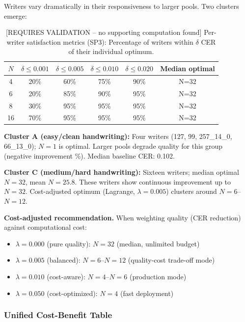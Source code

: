 \documentclass[10.5pt,a4paper]{article}
\newcommand{\src}[1]{\par\vspace{1pt}{\footnotesize\textcolor{gray}{Source:} #1\par}}
\begin{document}
Writers vary dramatically in their responsiveness to larger pools. Two clusters emerge:

\begin{table}[H]
\centering
\caption{[REQUIRES VALIDATION -- no supporting computation found] Per-writer satisfaction metrics (SP3): Percentage of writers within $\delta$ CER of their individual optimum.}
\label{tab:f8_satisfaction}
\small
\begin{tabular}{cccccc}
\toprule
$N$ & $\delta \le 0.001$ & $\delta \le 0.005$ & $\delta \le 0.010$ & $\delta \le 0.020$ & Median optimal \\
\midrule
4 & 20\% & 60\% & 75\% & 90\% & N=32 \\
6 & 20\% & 85\% & 90\% & 95\% & N=32 \\
8 & 30\% & 95\% & 95\% & 95\% & N=32 \\
16 & 70\% & 95\% & 95\% & 95\% & N=32 \\
\bottomrule
\end{tabular}
\src{SP3 per-writer analysis}
\end{table}

\textbf{Cluster A (easy/clean handwriting):} Four writers (127, 99, 257\_14\_0, 66\_13\_0); $N{=}1$ is optimal. Larger pools
degrade quality for this group (negative improvement \%). Median baseline CER: 0.102.

\textbf{Cluster C (medium/hard handwriting):} Sixteen writers; median optimal $N{=}32$, mean $N{=}25.8$. These writers show
continuous improvement up to $N{=}32$. Cost-adjusted optimum (Lagrange, $\lambda{=}0.005$) clusters around $N{=}6$--$N{=}12$.

\textbf{Cost-adjusted recommendation.} When weighting quality (CER reduction) against computational cost:
\begin{itemize}
	\item $\lambda{=}0.000$ (pure quality): $N{=}32$ (median, unlimited budget)
	\item $\lambda{=}0.005$ (balanced): $N{=}6$--$N{=}12$ (quality-cost trade-off mode)
	\item $\lambda{=}0.010$ (cost-aware): $N{=}4$--$N{=}6$ (production mode)
	\item $\lambda{=}0.050$ (cost-optimized): $N{=}4$ (fast deployment)
\end{itemize}

\subsubsection{Unified Cost-Benefit Table}
\end{document}
